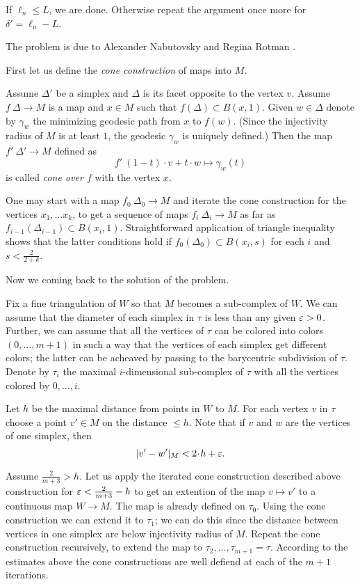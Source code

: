 If $\ell_n\le L$, we are done.
Otherwise repeat the argument once more for $\delta'=\ell_n-L$.
\qeds

The problem is due to 
Alexander Nabutovsky 
and Regina Rotman \cite[see][]{nabutovsky-rotman}.


First let us define the {}\emph{cone construction} of maps into $M$.

Assume $\Delta'$ be a simplex and $\Delta$ is its facet opposite to the vertex $v$.
Assume $f\:\Delta\to M$ is a map and $x\in M$ such that $f(\Delta)\subset B(x,1)$.
Given $w\in \Delta$ denote by $\gamma_w$ the minimizing geodesic path from $x$ to  $f(w)$.
(Since the injectivity radius of $M$ is at least $1$, the geodesic $\gamma_w$ is uniquely defined.)
Then the map $f'\:\Delta'\to M$ defined as 
\[f'\:(1-t)\cdot v+t\cdot w\mapsto \gamma_w(t)\] 
is called {}\emph{cone over $f$} with the vertex $x$. 

One may start with a map $f_0\:\Delta_0\to M$ and iterate the cone construction for the vertices $x_1,\dots x_k$,
to get a sequence of maps $f_i\:\Delta_i\to M$
as far as $f_{i-1}(\Delta_{i-1})\subset B(x_i,1)$.
Straightforward application of triangle inequality 
shows that the latter conditions hold if 
$f_0(\Delta_0)\subset B(x_i,s)$ for each $i$ and $s<\tfrac2{2+k}$.

\medskip

Now we coming back to the solution of the problem.

Fix a fine triangulation of $W$ so that $M$ becomes a sub-complex of $W$.
We can assume that the diameter of each simplex in $\tau$ is less than any given
$\varepsilon>0$.
Further, we can assume that all the vertices of $\tau$ can be colored into colors $(0,\dots, m+1)$
in such a way that the vertices of each simplex 
get different colors;
the latter can be acheaved by passing to the barycentric subdivision of $\tau$.
Denote by $\tau_i$ the maximal $i$-dimensional sub-complex of $\tau$ 
with all the vertices colored by $0,\dots, i$.

Let $h$ be the maximal distance from points in $W$ to $M$.
For each vertex $v$ in $\tau$ 
choose a point $v'\in M$ on the distance $\le h$.
Note that 
if $v$ and $w$ are the vertices of one simplex,
then
\[|v'-w'|_M<2\cdot h+\eps.\]

Assume $\tfrac{2}{m+3}>h$.
Let us apply the iterated cone construction described above construction for $\varepsilon<\tfrac{2}{m+3}-h$ to get an extention of the map $v\mapsto v'$ 
to a continuous 
map $W\to M$.
The map is already defined on $\tau_0$.
Using the cone construction we can extend it to $\tau_1$;
we can do this since the distance between vertices in one simplex are below injectivity radius of $M$.
Repeat the cone construction recursively, to extend the map to $\tau_2,\dots,\tau_{m+1}=\tau$.
According to the estimates above the cone constructions are well defiend at each of the $m+1$ iterations.


